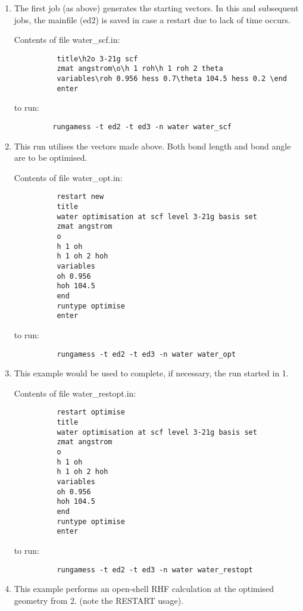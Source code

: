 \documentclass[11pt,fleqn]{article}
\begin{document}
\begin{enumerate}
\item The first job (as above) generates the starting vectors. 
In this and subsequent jobs, the 
mainfile (ed2) is saved in case a restart due to lack of time occurs.

Contents of file water\_scf.in:
{
\footnotesize
\begin{verbatim}
          title\h2o 3-21g scf
          zmat angstrom\o\h 1 roh\h 1 roh 2 theta
          variables\roh 0.956 hess 0.7\theta 104.5 hess 0.2 \end
          enter
\end{verbatim}
}
to run:
{
\footnotesize
\begin{verbatim}
         rungamess -t ed2 -t ed3 -n water water_scf
\end{verbatim}
}

\item This run utilises the vectors made above. Both bond length and
bond angle are to be optimised. 


Contents of file water\_opt.in:
{
\footnotesize
\begin{verbatim}
          restart new
          title
          water optimisation at scf level 3-21g basis set
          zmat angstrom
          o
          h 1 oh
          h 1 oh 2 hoh
          variables
          oh 0.956
          hoh 104.5
          end
          runtype optimise
          enter
\end{verbatim}
}
to run:
{
\footnotesize
\begin{verbatim}
          rungamess -t ed2 -t ed3 -n water water_opt
\end{verbatim}
}
\item This example would be used
to complete, if necessary, the run started in  1.

Contents of file water\_restopt.in:
{
\footnotesize
\begin{verbatim}
          restart optimise
          title
          water optimisation at scf level 3-21g basis set
          zmat angstrom
          o
          h 1 oh
          h 1 oh 2 hoh
          variables
          oh 0.956
          hoh 104.5
          end
          runtype optimise
          enter
\end{verbatim}
}
to run:
{
\footnotesize
\begin{verbatim}
          rungamess -t ed2 -t ed3 -n water water_restopt
\end{verbatim}
}
\item This example performs an open-shell RHF calculation 
at the optimised geometry from 2. (note the RESTART usage).


\end{enumerate}
\end{document}
